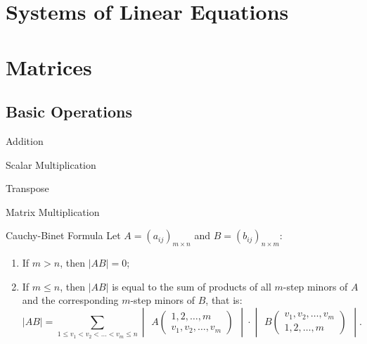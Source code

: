 \documentclass[11pt]{../../TexTemplate/elegantbook} %
\begin{document}
\chapter{Systems of Linear Equations}

\chapter{Matrices}
\section{Basic Operations}
\begin{leftbarTitle}{Addition}\end{leftbarTitle}
\begin{leftbarTitle}{Scalar Multiplication}\end{leftbarTitle}
\begin{leftbarTitle}{Transpose}\end{leftbarTitle}
\begin{leftbarTitle}{Matrix Multiplication}\end{leftbarTitle}

\begin{theorem}{Cauchy-Binet Formula}
    Let \( A = (a_{ij})_{m \times n} \) and \( B = (b_{ij})_{n \times m} \):  
    \begin{enumerate}
        \item If \( m > n \), then \( |AB| = 0 \);
        \item If \( m \leq n \), then \( |AB| \) is equal to 
        the sum of products of all \( m \)-step minors of \( A \) and 
        the corresponding \( m \)-step minors of \( B \), that is:
        \[
        |AB| = \sum_{1 \leq v_1 < v_2 < \dots < v_m \leq n} 
        \begin{vmatrix}
        A\begin{pmatrix}
        1, 2, \dots, m \\
        v_1, v_2, \dots, v_m
        \end{pmatrix}
        \end{vmatrix}
        \cdot 
        \begin{vmatrix}
        B\begin{pmatrix}
        v_1, v_2, \dots, v_m \\
        1, 2, \dots, m
        \end{pmatrix}
        \end{vmatrix}.
        \]
    \end{enumerate}
\end{theorem}
\end{document}
